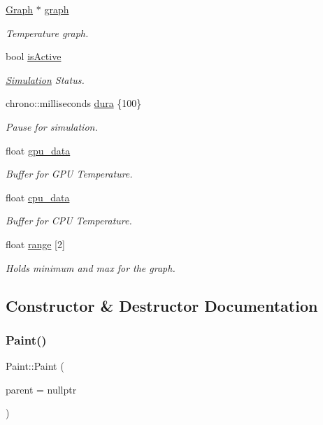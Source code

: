 \begin{DoxyCompactItemize}
\mbox{\hyperlink{classGraph}{Graph}} $\ast$ \mbox{\hyperlink{classPaint_a7c4451334289c681e3763ba244227b7a}{graph}}
\begin{DoxyCompactList}\small\item\em Temperature graph. \end{DoxyCompactList}\item 
bool \mbox{\hyperlink{classPaint_ad3674af36118608e17d5f49812f0e398}{is\+Active}}
\begin{DoxyCompactList}\small\item\em \mbox{\hyperlink{classSimulation}{Simulation}} Status. \end{DoxyCompactList}\item 
chrono\+::milliseconds \mbox{\hyperlink{classPaint_a596f261f63bbc34d4ec35639eeb148ce}{dura}} \{100\}
\begin{DoxyCompactList}\small\item\em Pause for simulation. \end{DoxyCompactList}\item 
float \mbox{\hyperlink{classPaint_a561a7ed14d82369f8a88ba76b0bcbb7e}{gpu\+\_\+data}}
\begin{DoxyCompactList}\small\item\em Buffer for G\+PU Temperature. \end{DoxyCompactList}\item 
float \mbox{\hyperlink{classPaint_a289c2a24e5186491ddd37a620eaac8b2}{cpu\+\_\+data}}
\begin{DoxyCompactList}\small\item\em Buffer for C\+PU Temperature. \end{DoxyCompactList}\item 
float \mbox{\hyperlink{classPaint_a7c7236ff4eb95bce87e4700dbc3385eb}{range}} \mbox{[}2\mbox{]}
\begin{DoxyCompactList}\small\item\em Holds minimum and max for the graph. \end{DoxyCompactList}\end{DoxyCompactItemize}


\subsection{Constructor \& Destructor Documentation}
\mbox{\label{classPaint_a3be358e4052f20b7342f17a37fc32c4e}} 
\subsubsection{\texorpdfstring{Paint()}{Paint()}}
{\footnotesize\ttfamily Paint\+::\+Paint (\begin{DoxyParamCaption}\item[{Q\+Widget $\ast$}]{parent = {\ttfamily nullptr} }\end{DoxyParamCaption})\hspace{0.3cm}{\ttfamily [explicit]}}

